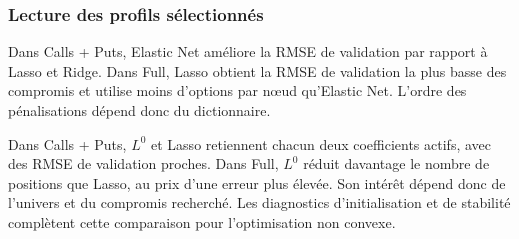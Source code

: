 \documentclass[12pt,a4paper]{article}
\newcommand{\1}{\mathbf{1}}
\begin{document}
\subsubsection*{Lecture des profils sélectionnés}

Dans Calls + Puts, Elastic Net améliore la RMSE de validation par rapport à Lasso et Ridge. Dans Full, Lasso obtient la RMSE de validation la plus basse des compromis et utilise moins d'options par nœud qu'Elastic Net. L'ordre des pénalisations dépend donc du dictionnaire.

Dans Calls + Puts, $L^0$ et Lasso retiennent chacun deux coefficients actifs, avec des RMSE de validation proches. Dans Full, $L^0$ réduit davantage le nombre de positions que Lasso, au prix d’une erreur plus élevée. Son intérêt dépend donc de l’univers et du compromis recherché. Les diagnostics d’initialisation et de stabilité complètent cette comparaison pour l’optimisation non convexe.
\end{document}
